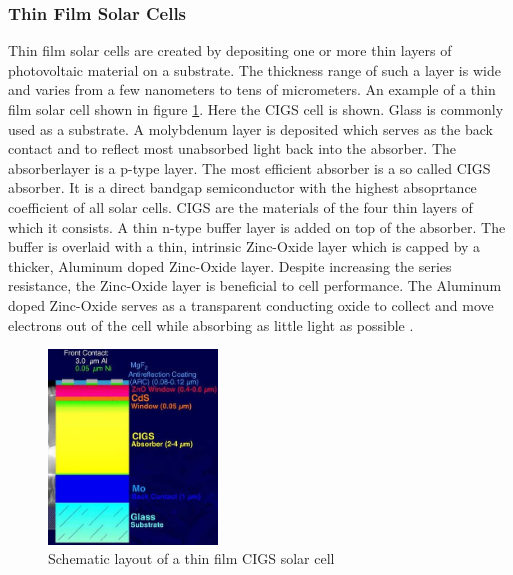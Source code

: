 \clearpage
\subsubsection{Thin Film Solar Cells}
Thin film solar cells are created by depositing one or more thin layers of photovoltaic material on a substrate. The thickness range of such a layer is wide and varies from a few nanometers to tens of micrometers. An example of a thin film solar cell shown in figure 
\ref{fig:thinfilm_cell}. Here the \ac{CIGS} cell is shown. Glass is commonly used as a substrate. A molybdenum layer is deposited which serves as the back contact and to reflect most unabsorbed light back into the absorber. The absorberlayer is a p-type layer. The most efficient absorber is a so called \ac{CIGS} absorber. It is a direct bandgap semiconductor with the highest absoprtance coefficient of all solar cells. \acl{CIGS} are the materials of the four thin layers of which it consists. A thin n-type buffer layer is added on top of the absorber. The buffer is overlaid with a thin, intrinsic Zinc-Oxide layer which is capped by a thicker, Aluminum doped Zinc-Oxide layer. Despite increasing the series resistance, the Zinc-Oxide layer is beneficial to cell performance. The Aluminum doped Zinc-Oxide serves as a transparent conducting oxide to collect and move electrons out of the cell while absorbing as little light as possible \cite{dhere}.

\begin{figure}
\centering
\includegraphics[width=0.4\textwidth]{chapters/img/thinfilm_solar_cell.png}
\caption{Schematic layout of a thin film CIGS solar cell}
\label{fig:thinfilm_cell}
\end{figure}

\clearpage
